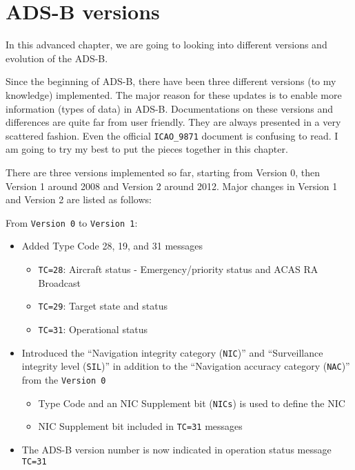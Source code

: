 \section{ADS-B versions}\label{ads-b-versions}

In this advanced chapter, we are going to looking into different versions and evolution of the ADS-B.

Since the beginning of ADS-B, there have been three different versions (to my knowledge) implemented. The major reason for these updates is to enable more information (types of data) in ADS-B. Documentations on these versions and differences are quite far from user friendly. They are always presented in a very scattered fashion. Even the official \texttt{ICAO\_9871} document is confusing to read. I am going to try my best to put the pieces together in this chapter.

There are three versions implemented so far, starting from Version 0, then Version 1 around 2008 and Version 2 around 2012. Major changes in Version 1 and Version 2 are listed as follows:

From \texttt{Version\ 0} to \texttt{Version\ 1}:

\begin{itemize}
\item
  Added Type Code 28, 19, and 31 messages

  \begin{itemize}
    \item
    \texttt{TC=28}: Aircraft status - Emergency/priority status and ACAS
    RA Broadcast
  \item
    \texttt{TC=29}: Target state and status
  \item
    \texttt{TC=31}: Operational status
  \end{itemize}
\item
  Introduced the ``Navigation integrity category (\texttt{NIC})'' and   ``Surveillance integrity level (\texttt{SIL})'' in addition to the   ``Navigation accuracy category (\texttt{NAC})'' from the \texttt{Version\ 0}

  \begin{itemize}
    \item
    Type Code and an NIC Supplement bit (\texttt{NICs}) is used to
    define the NIC
  \item
    NIC Supplement bit included in \texttt{TC=31} messages
  \end{itemize}
\item
  The ADS-B version number is now indicated in operation status message
  \texttt{TC=31}
\end{itemize}

